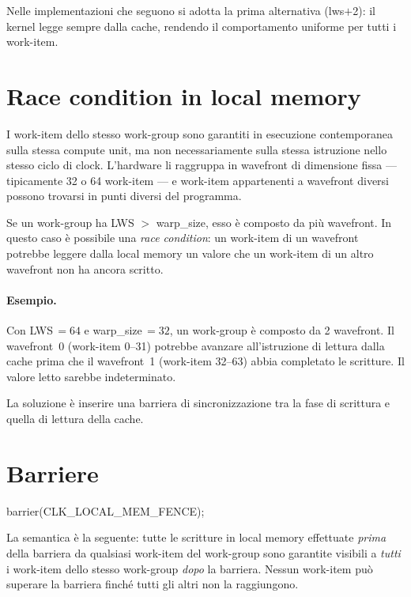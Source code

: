 Nelle implementazioni che seguono si adotta la prima alternativa (lws$+$2): il kernel legge sempre dalla cache, rendendo il comportamento uniforme per tutti i work-item.

\section{Race condition in local memory}\label{sec:opencl_lmem_race}

I work-item dello stesso work-group sono garantiti in esecuzione contemporanea sulla stessa compute unit, ma non necessariamente sulla stessa istruzione nello stesso ciclo di clock. L'hardware li raggruppa in wavefront di dimensione fissa — tipicamente 32 o 64 work-item — e work-item appartenenti a wavefront diversi possono trovarsi in punti diversi del programma.

Se un work-group ha LWS $>$ warp\_size, esso è composto da più wavefront. In questo caso è possibile una \emph{race condition}: un work-item di un wavefront potrebbe leggere dalla local memory un valore che un work-item di un altro wavefront non ha ancora scritto.

\paragraph{Esempio.} Con LWS\,$=64$ e warp\_size\,$=32$, un work-group è composto da 2 wavefront. Il wavefront~0 (work-item 0--31) potrebbe avanzare all'istruzione di lettura dalla cache prima che il wavefront~1 (work-item 32--63) abbia completato le scritture. Il valore letto sarebbe indeterminato.

La soluzione è inserire una barriera di sincronizzazione tra la fase di scrittura e quella di lettura della cache.

\section{Barriere}\label{sec:opencl_lmem_barrier}

\begin{code}[caption={Barriera di sincronizzazione sulla local memory}, label={code:barrier}]
barrier(CLK_LOCAL_MEM_FENCE);
\end{code}

La semantica è la seguente: tutte le scritture in local memory effettuate \emph{prima} della barriera da qualsiasi work-item del work-group sono garantite visibili a \emph{tutti} i work-item dello stesso work-group \emph{dopo} la barriera. Nessun work-item può superare la barriera finché tutti gli altri non la raggiungono.

